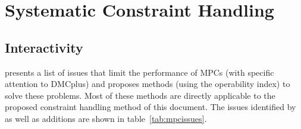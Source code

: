 \chapter{Systematic Constraint Handling}\label{chap:conhand}
\begin{overview}
\end{overview}

\section{Interactivity}
\citet{vinsonphd} presents a list of issues that limit the performance of MPCs (with specific attention to DMCplus) and proposes methods (using the operability index) to solve these problems. 
Most of these methods are directly applicable to the proposed constraint handling method of this document. 
The issues identified by \citet{vinsonphd} as well as additions are shown in table~\ref{tab:mpcissues}.
